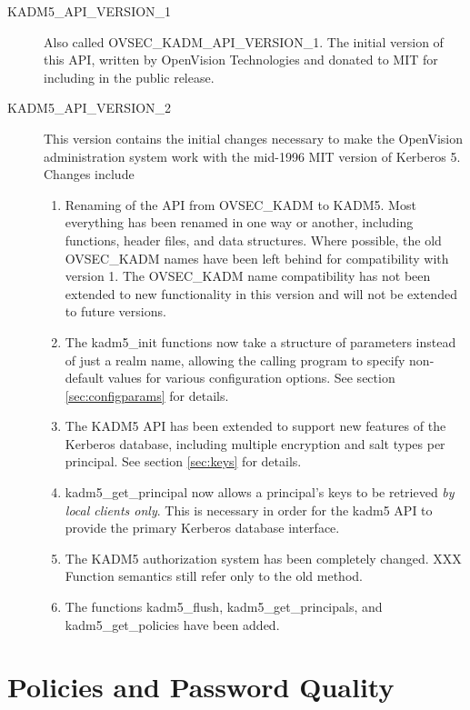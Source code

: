 \begin{description}
\item[KADM5_API_VERSION_1] Also called OVSEC_KADM_API_VERSION_1.  The
initial version of this API, written by OpenVision Technologies and
donated to MIT for including in the public release.

\item[KADM5_API_VERSION_2] This version contains the initial changes
necessary to make the OpenVision administration system work with the
mid-1996 MIT version of Kerberos 5.  Changes include
\begin{enumerate}
\item Renaming of the API from OVSEC_KADM to KADM5.  Most everything
has been renamed in one way or another, including functions, header
files, and data structures.  Where possible, the old OVSEC_KADM names
have been left behind for compatibility with version 1.  The
OVSEC_KADM name compatibility has not been extended to new
functionality in this version and will not be extended to future
versions.

\item The kadm5_init functions now take a structure of parameters
instead of just a realm name, allowing the calling program to specify
non-default values for various configuration options.  See section
\ref{sec:configparams} for details.

\item The KADM5 API has been extended to support new features of the
Kerberos database, including multiple encryption and salt types per
principal.  See section \ref{sec:keys} for details.

\item kadm5_get_principal now allows a principal's keys to be
retrieved {\it by local clients only}.  This is necessary in order for
the kadm5 API to provide the primary Kerberos database interface.

\item The KADM5 authorization system has been completely changed.  XXX
Function semantics still refer only to the old method.

\item The functions kadm5_flush, kadm5_get_principals, and
kadm5_get_policies have been added.
\end{enumerate}
\end{description}

\section{Policies and Password Quality}

